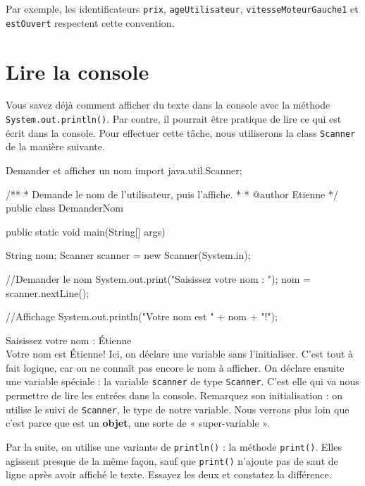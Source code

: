 \documentclass[12pt]{report}
\newcommand{\commande}[1]{%
\tcbox[on line, size=fbox, colframe=black, boxrule=0.75pt, tcbox raise base]{#1} %
}
\newenvironment{console}
	{
	\tcolorbox[title={Sortie console}, sharp corners = south, boxsep = 1.5mm]{} \tt
	}{\endtcolorbox}
\begin{document}
Par exemple, les identificateurs \texttt{prix}, \texttt{ageUtilisateur}, \texttt{vitesseMoteurGauche1} et \texttt{estOuvert} respectent cette convention. 




%
\section{Lire la console}
%
Vous savez déjà comment afficher du texte dans la console avec la méthode \texttt{System.out.println()}. Par contre, il pourrait être pratique de lire ce qui est écrit dans la console. Pour effectuer cette tâche, nous utiliserons la class \texttt{Scanner} de la manière suivante.

%
\begin{MyTCB}{Demander et afficher un nom}
import java.util.Scanner;

/**
 * Demande le nom de l'utilisateur, puis l'affiche.
 * 
 * @author Etienne
 */
public class DemanderNom {

	public static void main(String[] args) {
		
		String nom;
		Scanner scanner = new Scanner(System.in);
		
		//Demander le nom
		System.out.print("Saisissez votre nom : ");
		nom = scanner.nextLine();
		
		//Affichage
		System.out.println("Votre nom est " + nom + "!");

	}

}
\end{MyTCB}

\begin{console}
Saisissez votre nom : {\color{blue} Étienne}\\
Votre nom est Étienne!
\end{console}
Ici, on déclare une variable sans l'initialiser. C'est tout à fait logique, car on ne connaît pas encore le nom à afficher. On déclare ensuite une variable spéciale : la variable \texttt{scanner} de type \texttt{Scanner}. C'est elle qui va nous permettre de lire les entrées dans la console. Remarquez son initialisation : on utilise le \commande{new} suivi de \texttt{Scanner}, le type de notre variable. Nous verrons plus loin que c'est parce que \commande{scanner} est un \textbf{objet}, une sorte de « super-variable ». 

Par la suite, on utilise une variante de \texttt{println()} : la méthode \texttt{print()}. Elles agissent presque de la même façon, sauf que \texttt{print()} n'ajoute pas de saut de ligne après avoir affiché le texte. Essayez les deux et constatez la différence.
\end{document}
